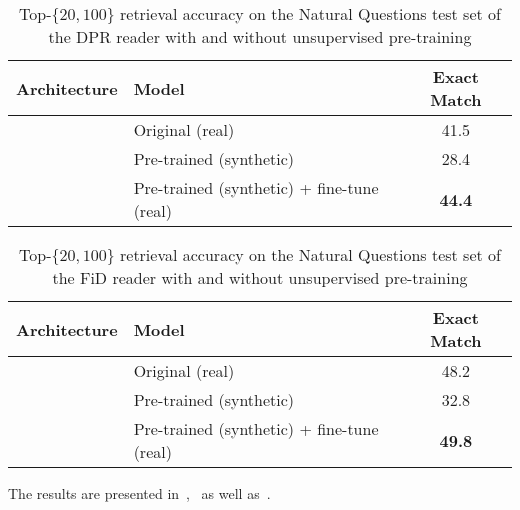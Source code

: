 \begin{table*}[t!]
	\setlength\tabcolsep{5pt}
	\centering
	\small
	\begin{tabular}{ll|c}
		\toprule
		\textbf{Architecture} & \textbf{Model}
		& Exact Match \\ 
		\midrule
		\multirow{3}{*}{\shortstack{DPR reader~\cite{karpukhin2020dense}}} 
		& Original (real) & 41.5  \\
		& Pre-trained (synthetic) & 28.4 \\
		& Pre-trained (synthetic) + fine-tune (real) & \textbf{44.4} \\
		\bottomrule
	\end{tabular}
	\caption[Top-$\{20, 100\}$ retrieval accuracy on the Natural Questions test set of the DPR reader with and without unsupervised pre-training.]{
		Top-$\{20, 100\}$ retrieval accuracy on the Natural Questions test set of the DPR reader with and without unsupervised pre-training
	}
	
	\label{tab:reader_unsupervised_pretraining}
\end{table*}




\begin{table*}[t!]
	\setlength\tabcolsep{5pt}
	\centering
	\small
	\begin{tabular}{ll|c}
		\toprule
		\textbf{Architecture} & \textbf{Model}
		& Exact Match \\ 
		\midrule
		\multirow{3}{*}{\shortstack{FiD reader~\cite{izacard2021leveraging}}} 
		& Original (real) & 48.2  \\
		& Pre-trained (synthetic) & 32.8 \\
		& Pre-trained (synthetic) + fine-tune (real) & \textbf{49.8} \\
		\bottomrule
	\end{tabular}
	\caption[Top-$\{20, 100\}$ retrieval accuracy on the Natural Questions test set of the FiD reader~\cite{izacard2021leveraging} with and without unsupervised pre-training.]{
		Top-$\{20, 100\}$ retrieval accuracy on the Natural Questions test set of the FiD reader with and without unsupervised pre-training
	}
	
	\label{tab:fid_reader_unsupervised_pretraining}
\end{table*}


The results are presented in~,~ as well as~.